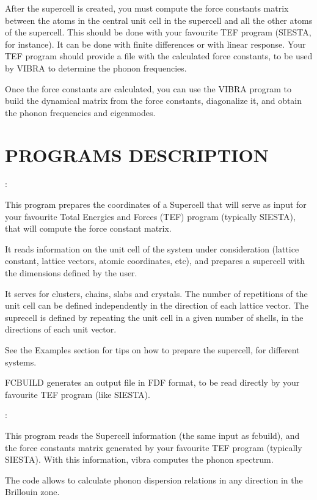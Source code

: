 \noindent
After the supercell is created, you must compute the
force constants matrix between the atoms in the
central unit cell in the supercell and all the other
atoms of the supercell.  This should be done
with your favourite TEF
program (SIESTA, for instance).  It can be
done with finite differences or with linear response.
Your TEF program should provide a file with the
calculated force constants, to be used by VIBRA to determine
the phonon frequencies.

\noindent
Once the force constants are calculated, you can use
the VIBRA program to build the dynamical matrix
from the force constants, diagonalize it, and obtain
the phonon frequencies and eigenmodes.

\section{PROGRAMS DESCRIPTION}

\begin{description}
\itemsep 10pt
\parsep 0pt

\item[{\bf FCBUILD}]:

\noindent
This program prepares the coordinates of a Supercell 
that will serve as input for your favourite Total Energies
and Forces (TEF) program (typically SIESTA), that will
compute the force constant matrix.

\noindent
It reads information on the unit cell of the system under
consideration (lattice constant, lattice vectors, atomic
coordinates, etc), and prepares a supercell with the
dimensions defined by the user. 

\noindent
It serves for clusters, chains, slabs and crystals.
The number of repetitions of the unit cell can
be defined independently in the direction of each
lattice vector. The suprecell is defined by
repeating the unit cell in a given number of shells,
in the directions of each unit vector.

\noindent
See the Examples section for tips on how to prepare
the supercell, for different systems.

\noindent
FCBUILD generates an output file in FDF format,
to be read directly by your favourite TEF
program (like SIESTA). 

\item[{\bf VIBRA}]:

\noindent
This program reads the Supercell information (the same
input as fcbuild), and the force constants matrix
generated by your favourite TEF
program (typically SIESTA). With this information,
vibra computes the phonon spectrum.

\noindent
The code allows to calculate phonon dispersion relations
in any direction in the Brillouin zone.

\end{description}



